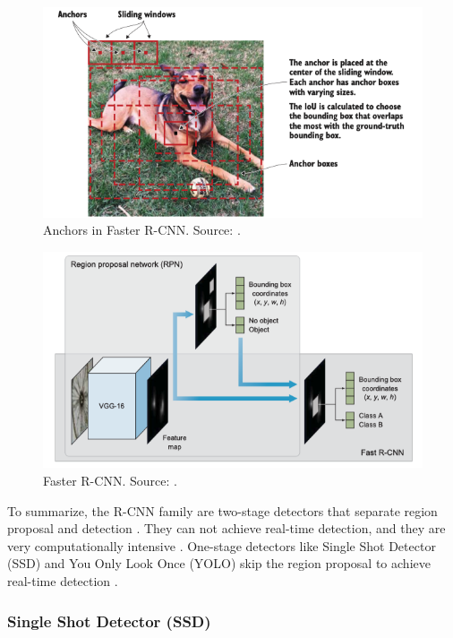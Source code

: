 \documentclass[a4paper, 11pt, oneside]{article}
\begin{document}
\begin{figure}[ht]
  \begin{center}
    \includegraphics[width=.8\textwidth]{anchors.png}
  \end{center}
  \caption{Anchors in Faster R-CNN. Source: \cite{elgendy2020deep}.}
\end{figure}

\begin{figure}[ht]
  \begin{center}
    \includegraphics[width=.8\textwidth]{faster_r_cnn.png}
  \end{center}
  \caption{Faster R-CNN. Source: \cite{elgendy2020deep}.}
\end{figure}

To summarize, the R-CNN family are two-stage detectors that separate region proposal and detection
\cite{elgendy2020deep, liu2020deep}. They can not achieve real-time detection, and they are very computationally
intensive \cite{elgendy2020deep, liu2016ssd, redmon2016you}. One-stage detectors like Single Shot Detector (SSD) and You
Only Look Once (YOLO) skip the region proposal to achieve real-time detection \cite{elgendy2020deep}.

\subsubsection{Single Shot Detector (SSD)}
\end{document}
